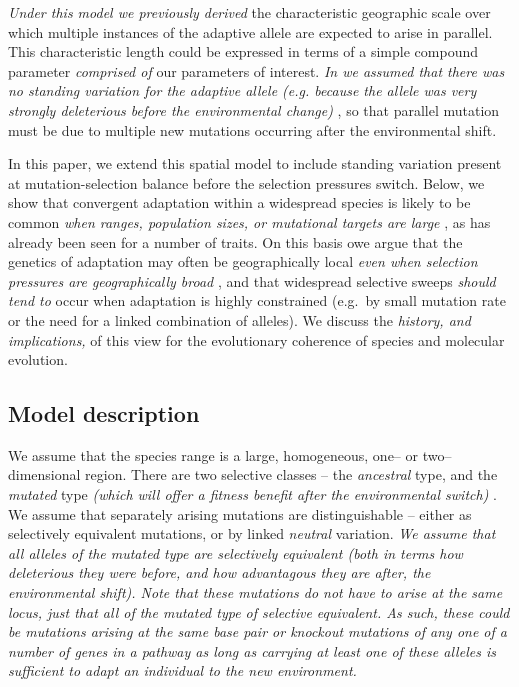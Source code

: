 \documentclass{article}
\newcommand{\gc}[1]{{\it\color{blue} #1} }
\newcommand{\mfp}[1]{{\it\color{red} #1} }
\begin{document}
\gc{Under this model we previously derived} the characteristic geographic scale over which 
multiple instances of the adaptive allele are expected to arise in parallel. 
This characteristic length could be expressed in terms of a simple compound
parameter \mfp{comprised of} our parameters of interest. \gc{In
\citet{ralphcoop2010} we assumed that there was no standing variation for the adaptive
allele (e.g. because the allele was very strongly deleterious before
the environmental change)}, 
so that parallel mutation must be due to multiple new mutations occurring after the environmental shift. 

In this paper, we extend this spatial model to include standing variation 
present at mutation-selection balance before the selection pressures switch.
Below,
we show that convergent adaptation within a widespread species is likely to be
common \gc{when ranges, population sizes, or mutational targets are large}, as has already been seen for a number of traits. 
On this basis owe argue 
that the genetics of adaptation may often be geographically local \gc{even
when selection pressures are geographically broad}, 
and that widespread selective sweeps \mfp{should tend to} occur
when adaptation is highly constrained (e.g.\ by small mutation rate or
the need for a linked combination of alleles).
We discuss the \gc{history, and implications,} of this view for the evolutionary
coherence of species and molecular evolution.

\subsection{Model description}


We assume that the species range
is a large, homogeneous, one-- or two--dimensional region. 
There are two selective classes -- the \gc{ {\em ancestral} } type,
and the {\em mutated} type \gc{(which will offer a fitness benefit after the
environmental switch)}.
We assume that separately arising mutations are distinguishable --
either as selectively equivalent mutations, or by linked \gc{neutral} variation.
\gc{We assume that all alleles of the mutated type are selectively
  equivalent (both in terms how deleterious they were before, and how
  advantagous they are after, the
  environmental shift). Note that these mutations do not have to arise at the same locus,
  just that all of the mutated type of selective equivalent. As such,
  these could be mutations arising at the same base pair or knockout
  mutations of any one of a number of genes in a pathway as long as carrying at least one of these alleles
  is sufficient to adapt an individual to the new environment.}
\end{document}
